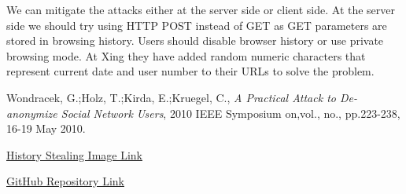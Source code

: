 \documentclass{article}
\begin{document}
We can mitigate the attacks either at the server side or client side. At the server side we should try using HTTP POST instead of GET as GET parameters are stored in browsing history. Users should disable browser history or use private browsing mode. At Xing they have added random numeric characters that represent current date and user number to their URLs to solve the problem.

\begin{thebibliography}{9}

  Wondracek, G.;Holz, T.;Kirda, E.;Kruegel, C.,
  \emph{A Practical Attack to De-anonymize Social Network Users},
  2010 IEEE Symposium on,vol., no., pp.223-238,
  16-19 May 2010.

\end{thebibliography}

\href{http://goo.gl/mmM16L}{History Stealing Image Link}

\href{https://github.com/dixita90/Security-Algorithms-Protocols.git}{GitHub Repository Link}
\end{document}
